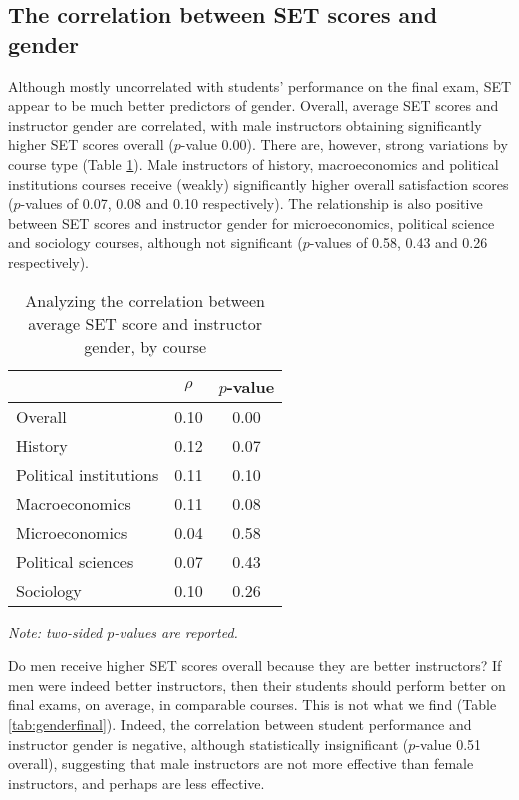 \documentclass[12pt]{article}
\begin{document}
\subsection{The correlation between SET scores and gender}


Although mostly uncorrelated with students' performance on the final exam, SET appear to be much better predictors of gender. Overall, average SET scores and instructor gender are correlated, with male instructors obtaining significantly higher SET scores overall ($p$-value 0.00). There are, however, strong variations by course type (Table \ref{tab:instructorgender}). Male instructors of history, macroeconomics and political institutions courses receive (weakly) significantly higher overall satisfaction scores ($p$-values of 0.07, 0.08 and 0.10 respectively). The relationship is also positive between SET scores and instructor gender for microeconomics, political science and sociology courses, although not significant ($p$-values of 0.58, 0.43 and 0.26 respectively).   

\begin{table}[htbp]
  \centering
  \footnotesize 
  \caption{Analyzing the correlation between average SET score and instructor gender, by course}
    \begin{tabular}{lcc}
    \toprule 
                          & $\rho$  & $p$-value     \\
   \midrule
    Overall &                 0.10       & 0.00     \\
    History &                 0.12       & 0.07     \\
    Political institutions &  0.11       & 0.10     \\
    Macroeconomics &          0.11       & 0.08     \\
    Microeconomics &          0.04       & 0.58     \\
    Political sciences &      0.07       & 0.43     \\
    Sociology &               0.10       & 0.26     \\
    \bottomrule
    \end{tabular}%
 \label{tab:instructorgender}%
  
  \textit{Note: two-sided $p$-values are reported.}
\end{table}%
\normalsize


Do men receive higher SET scores overall because they are better instructors? 
If men were indeed better instructors, then their students should perform better on final exams, on average,
in comparable courses. 
This is not what we find (Table \ref{tab:genderfinal}). 
Indeed, the correlation between student performance and instructor gender is negative, although statistically insignificant ($p$-value 0.51 overall), suggesting that male instructors are not more effective
than female instructors, and perhaps are less effective. 
\end{document}
